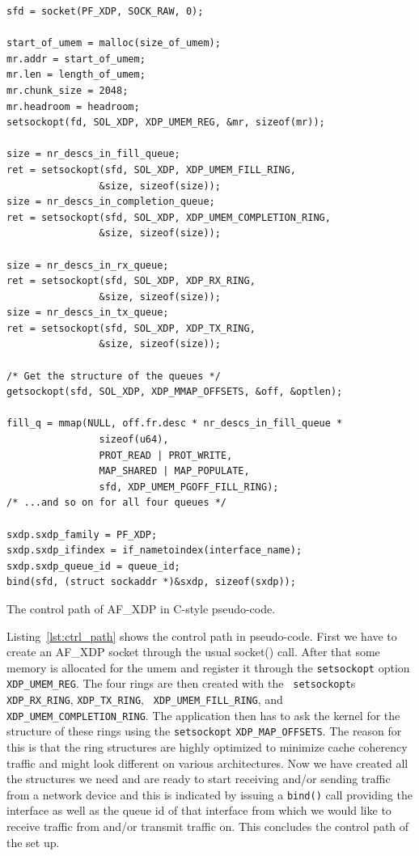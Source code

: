 \documentclass[9pt,numbers,reprint]{sigplanconf}
\begin{document}
\begin{listing}[ht]
\centering
\begin{verbatim}
sfd = socket(PF_XDP, SOCK_RAW, 0);

start_of_umem = malloc(size_of_umem);
mr.addr = start_of_umem;
mr.len = length_of_umem;
mr.chunk_size = 2048;
mr.headroom = headroom;
setsockopt(fd, SOL_XDP, XDP_UMEM_REG, &mr, sizeof(mr));

size = nr_descs_in_fill_queue;
ret = setsockopt(sfd, SOL_XDP, XDP_UMEM_FILL_RING,
                &size, sizeof(size));
size = nr_descs_in_completion_queue;
ret = setsockopt(sfd, SOL_XDP, XDP_UMEM_COMPLETION_RING,
                &size, sizeof(size));

size = nr_descs_in_rx_queue;
ret = setsockopt(sfd, SOL_XDP, XDP_RX_RING,
                &size, sizeof(size));
size = nr_descs_in_tx_queue;
ret = setsockopt(sfd, SOL_XDP, XDP_TX_RING,
                &size, sizeof(size));

/* Get the structure of the queues */
getsockopt(sfd, SOL_XDP, XDP_MMAP_OFFSETS, &off, &optlen);

fill_q = mmap(NULL, off.fr.desc * nr_descs_in_fill_queue *
                sizeof(u64),
                PROT_READ | PROT_WRITE,
                MAP_SHARED | MAP_POPULATE,
                sfd, XDP_UMEM_PGOFF_FILL_RING);
/* ...and so on for all four queues */

sxdp.sxdp_family = PF_XDP;
sxdp.sxdp_ifindex = if_nametoindex(interface_name);
sxdp.sxdp_queue_id = queue_id;
bind(sfd, (struct sockaddr *)&sxdp, sizeof(sxdp));
\end{verbatim}
\caption{The control path of AF\_XDP in C-style pseudo-code.}
\label{lst:ctrl_path}
\end{listing}

Listing~\ref{lst:ctrl_path} shows the control path in
pseudo-code. First we have to create an AF\_XDP socket through the
usual socket() call. After that some memory is allocated for the umem
and register it through the {\tt setsockopt} option {\tt
  XDP\_UMEM\_REG}. The four rings are then created with the {\tt
  setsockopt}s {\tt XDP\_RX\_RING}, {\tt XDP\_TX\_RING}, {\tt
  XDP\_UMEM\_FILL\_RING}, and {\tt XDP\_UMEM\_COMPLETION\_RING}. The
application then has to ask the kernel for the structure of these
rings using the {\tt setsockopt} {\tt XDP\_MAP\_OFFSETS}. The reason
for this is that the ring structures are highly optimized to minimize
cache coherency traffic and might look different on various
architectures. Now we have created all the structures we need and are
ready to start receiving and/or sending traffic from a network device
and this is indicated by issuing a {\tt bind()} call providing the
interface as well as the queue id of that interface from which we
would like to receive traffic from and/or transmit traffic on. This
concludes the control path of the set up.
\end{document}
